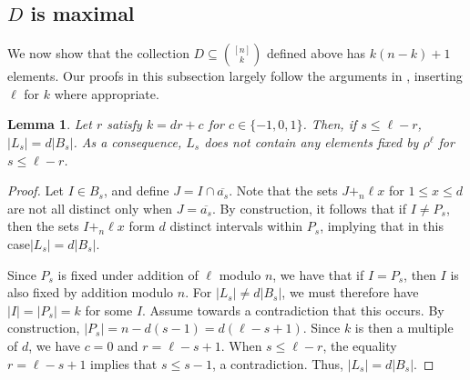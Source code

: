 \documentclass[11pt]{amsart}
\theoremstyle{plain}
\newtheorem{lemma}[theorem]{Lemma}
\theoremstyle{definition}
\begin{document}
\subsection{$D$ is maximal} We now show that the collection $D\subseteq {[n] \choose k}$ defined above has $k(n-k)+1$ elements. Our proofs in this subsection largely follow the arguments in \cite[Section 4]{PasqTZ2019}, inserting $\ell$ for $k$ where appropriate.
\begin{lemma}\label{lemma: sizeLsSmalls}
Let $r$ satisfy $k=dr+c$ for $c \in \{-1, 0, 1\}$. Then, if $s \leq \ell - r$, $|L_s|=d|B_s|$. As a consequence, $L_s$ does not contain any elements fixed by $\rho^\ell$ for $s\leq \ell -r$.
\end{lemma} 

\begin{proof}
 Let $I \in B_s$, and define $J=I \cap \overline{a_s}$. Note that the sets $J+_n \ell x$  for $1 \leq x \leq d$ are not all distinct only when $J=\overline{a_s}$. By construction, it follows that %
if $I \neq P_s$, then the sets $I+_n \ell x$ form $d$ distinct intervals within $P_s$, implying that in this case$|L_s|=d|B_s|$.

Since $P_s$ is fixed under addition of $\ell$ modulo $n$, we have that if $I=P_s$, then $I$ is also fixed by addition modulo $n$. 
For $|L_s| \neq d |B_s|$,  we must therefore have $|I|=|P_s|=k$ for some $I$. Assume towards a contradiction that this occurs. By construction, $|P_s|=n-d(s-1)=d(\ell-s+1)$. Since $k$ is then a multiple of $d$, we have $c=0$ and $r=\ell-s+1$. When $s \leq \ell-r$, the equality $r=\ell - s + 1$ implies that $s \leq s-1$, a contradiction. Thus, $|L_s|=d|B_s|$. 
\end{proof}
\end{document}
